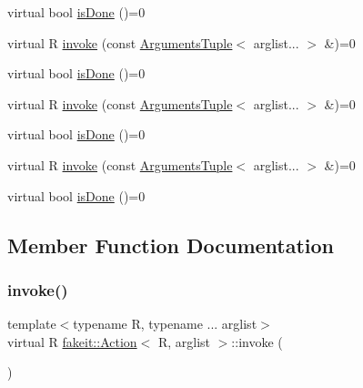 \begin{DoxyCompactItemize}
virtual bool \mbox{\hyperlink{structfakeit_1_1Action_a0b9ab2c889a54c07dcaa8efc101a5cbc}{is\+Done}} ()=0
\item 
virtual R \mbox{\hyperlink{structfakeit_1_1Action_a85503300bf8134ce55761db5f643b00c}{invoke}} (const \mbox{\hyperlink{namespacefakeit_a476a37a598825e1b5dd67b3a176491a1}{Arguments\+Tuple}}$<$ arglist... $>$ \&)=0
\item 
virtual bool \mbox{\hyperlink{structfakeit_1_1Action_a0b9ab2c889a54c07dcaa8efc101a5cbc}{is\+Done}} ()=0
\item 
virtual R \mbox{\hyperlink{structfakeit_1_1Action_a85503300bf8134ce55761db5f643b00c}{invoke}} (const \mbox{\hyperlink{namespacefakeit_a476a37a598825e1b5dd67b3a176491a1}{Arguments\+Tuple}}$<$ arglist... $>$ \&)=0
\item 
virtual bool \mbox{\hyperlink{structfakeit_1_1Action_a0b9ab2c889a54c07dcaa8efc101a5cbc}{is\+Done}} ()=0
\item 
virtual R \mbox{\hyperlink{structfakeit_1_1Action_a85503300bf8134ce55761db5f643b00c}{invoke}} (const \mbox{\hyperlink{namespacefakeit_a476a37a598825e1b5dd67b3a176491a1}{Arguments\+Tuple}}$<$ arglist... $>$ \&)=0
\item 
virtual bool \mbox{\hyperlink{structfakeit_1_1Action_a0b9ab2c889a54c07dcaa8efc101a5cbc}{is\+Done}} ()=0
\end{DoxyCompactItemize}


\subsection{Member Function Documentation}
\mbox{\label{structfakeit_1_1Action_a85503300bf8134ce55761db5f643b00c}} 
\subsubsection{\texorpdfstring{invoke()}{invoke()}\hspace{0.1cm}{\footnotesize\ttfamily [1/9]}}
{\footnotesize\ttfamily template$<$typename R, typename ... arglist$>$ \\
virtual R \mbox{\hyperlink{structfakeit_1_1Action}{fakeit\+::\+Action}}$<$ R, arglist $>$\+::invoke (\begin{DoxyParamCaption}\item[{const \mbox{\hyperlink{namespacefakeit_a476a37a598825e1b5dd67b3a176491a1}{Arguments\+Tuple}}$<$ arglist... $>$ \&}]{ }\end{DoxyParamCaption})\hspace{0.3cm}{\ttfamily [pure virtual]}}



